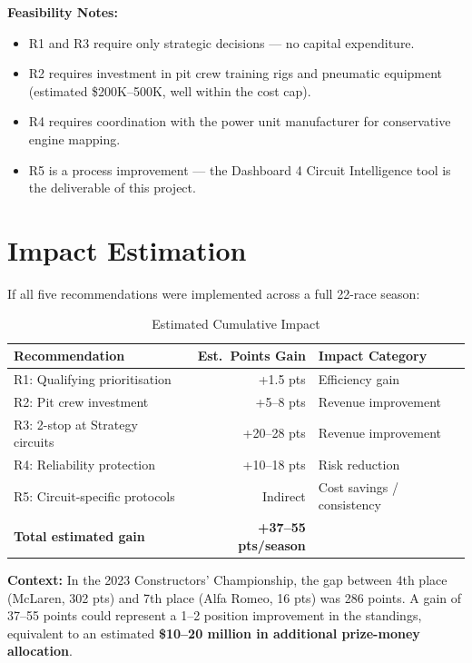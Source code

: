 \documentclass[12pt, a4paper]{article}
\begin{document}
\textbf{Feasibility Notes:}
\begin{itemize}
    \item R1 and R3 require only strategic decisions --- no capital expenditure.
    \item R2 requires investment in pit crew training rigs and pneumatic equipment (estimated \$200K--500K, well within the cost cap).
    \item R4 requires coordination with the power unit manufacturer for conservative engine mapping.
    \item R5 is a process improvement --- the Dashboard 4 Circuit Intelligence tool is the deliverable of this project.
\end{itemize}

\newpage

\section{Impact Estimation}

If all five recommendations were implemented across a full 22-race season:

\begin{table}[H]
\centering
\caption{Estimated Cumulative Impact}
\begin{tabular}{l r l}
\toprule
\textbf{Recommendation} & \textbf{Est.\ Points Gain} & \textbf{Impact Category} \\
\midrule
R1: Qualifying prioritisation    & +1.5 pts   & Efficiency gain \\
R2: Pit crew investment          & +5--8 pts  & Revenue improvement \\
R3: 2-stop at Strategy circuits  & +20--28 pts & Revenue improvement \\
R4: Reliability protection       & +10--18 pts & Risk reduction \\
R5: Circuit-specific protocols   & Indirect   & Cost savings / consistency \\
\midrule
\textbf{Total estimated gain}    & \textbf{+37--55 pts/season} & \\
\bottomrule
\end{tabular}
\end{table}

\textbf{Context:} In the 2023 Constructors' Championship, the gap between 4th place (McLaren, 302 pts) and 7th place (Alfa Romeo, 16 pts) was 286 points. A gain of 37--55 points could represent a 1--2 position improvement in the standings, equivalent to an estimated \textbf{\$10--20 million in additional prize-money allocation}.
\end{document}
